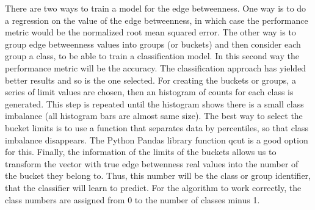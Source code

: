 There are two ways to train a model for the edge betweenness. One way is to do a regression on the value of the edge betweenness, in which case the performance metric would be the normalized root mean squared error. The other way is to group edge betweenness values into groups (or buckets) and then consider each group a class, to be able to train a classification model. In this second way the performance metric will be the accuracy. The classification approach has yielded better results and so is the one selected. For creating the buckets or groups, a series of limit values are chosen, then an histogram of counts for each class is generated. This step is repeated until the histogram shows there is a small class imbalance (all histogram bars are almost same size). The best way to select the bucket limits is to use a function that separates data by percentiles, so that class imbalance disappears. The Python Pandas library function qcut is a good option for this. Finally, the information of the limits of the buckets allows us to transform the vector with true edge betwenness real values into the number of the bucket they belong to. Thus, this number will be the class or group identifier, that the classifier will learn to predict. For the algorithm to work correctly, the class numbers are assigned from 0 to the number of classes minus 1.





